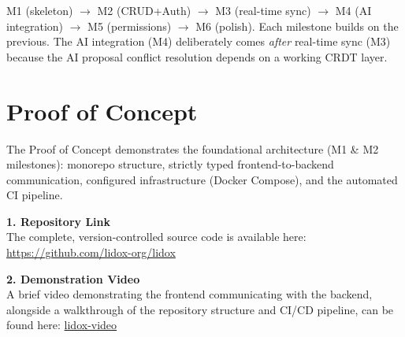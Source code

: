 \documentclass[10pt, a4paper]{article}
\newcommand{\lightrule}{{\color{border}\rule{\textwidth}{0.4pt}}}
\begin{document}
\vspace{8pt}
\begin{notebox}
\small M1 (skeleton) $\to$ M2 (CRUD+Auth) $\to$ M3 (real-time sync) $\to$ M4 (AI integration) $\to$ M5 (permissions) $\to$ M6 (polish). Each milestone builds on the previous. The AI integration (M4) deliberately comes \emph{after} real-time sync (M3) because the AI proposal conflict resolution depends on a working CRDT layer.
\end{notebox}



\section{Proof of Concept}

\begin{notebox}
\small The Proof of Concept demonstrates the foundational architecture (M1 \& M2 milestones): monorepo structure, strictly typed frontend-to-backend communication, configured infrastructure (Docker Compose), and the automated CI pipeline. 
\end{notebox}

\vspace{10pt}
\noindent
\textbf{\large 1. Repository Link}\\[4pt]
The complete, version-controlled source code is available here:\\
\url{https://github.com/lidox-org/lidox}

\vspace{10pt}
\noindent
\textbf{\large 2. Demonstration Video}\\[4pt]
A brief video demonstrating the frontend communicating with the backend, alongside a walkthrough of the repository structure and CI/CD pipeline, can be found here: \href{https://mbzuaiac-my.sharepoint.com/:f:/g/personal/abror_shopulatov_mbzuai_ac_ae/IgBouzKI14t7TKpjQfCvi6jUAZ9-GNJulMKSRsfUx6hQgVU?e=2nZIbh}{lidox-video}
\end{document}
